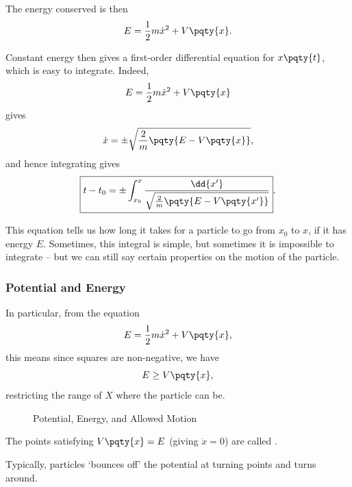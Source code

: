 The energy conserved is then
\begin{equation}
    E = \frac{1}{2} m \dot{x}^2 + V\pqty{x}.
\end{equation}

Constant energy then gives a first-order differential equation for \(x\pqty{t}\), which is easy to integrate. Indeed,
\begin{equation}
    E = \frac{1}{2} m \dot{x}^2 + V\pqty{x}
\end{equation}
gives
\begin{equation}
    \dot{x} = \pm \sqrt{\frac{2}{m} \pqty{E - V\pqty{x}}},
\end{equation}
and hence integrating gives
\begin{equation}
    \boxed{t - t_0 = \pm \int_{x_0}^{x} \frac{\dd{x'}}{\sqrt{\frac{2}{m} \pqty{E - V\pqty{x'}}}}}.
\end{equation}

This equation tells us how long it takes for a particle to go from \(x_0\) to \(x\), if it has energy \(E\). Sometimes, this integral is simple, but sometimes it is impossible to integrate -- but we can still say certain properties on the motion of the particle.

\subsubsection{Potential and Energy}

In particular, from the equation
\begin{equation}
    E = \frac{1}{2} m \dot{x}^2 + V\pqty{x},
\end{equation}
this means since squares are non-negative, we have
\begin{equation}
    E \geq V\pqty{x},
\end{equation}
restricting the range of \(X\) where the particle can be.

\begin{figure}[ht!]
    \centering

    \caption{Potential, Energy, and Allowed Motion}
    \label{fig:potential-energy-allowed-motion}%
\end{figure}

\begin{definition}
    The points satisfying  \(V\pqty{x} = E\) (giving \(\dot{x} = 0\)) are called .
\end{definition}

Typically, particles `bounces off' the potential at turning points and turns around.

